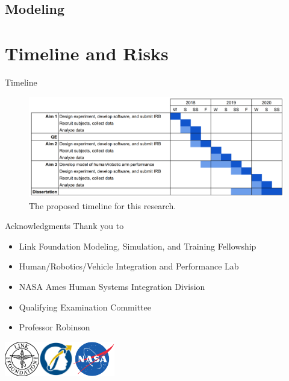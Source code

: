 \documentclass[10pt]{beamer}
\begin{document}
\subsection{Modeling}

\section{Timeline and Risks}

\begin{frame}[fragile]{Timeline}
  \begin{figure}[h!]
    \begin{center}
      \includegraphics[width=\linewidth]{./../img/image1.png}
      \caption{The proposed timeline for this research.}
      \label{timeline}
    \end{center}
  \end{figure}
\end{frame}

\begin{frame}[fragile]{Acknowledgments}
  Thank you to
  \begin{itemize}
    \item Link Foundation Modeling, Simulation, and Training Fellowship
    \item Human/Robotics/Vehicle Integration and Performance Lab
    \item NASA Ames Human Systems Integration Division
    \item Qualifying Examination Committee
    \item Professor Robinson
  \end{itemize}
  \hfill\includegraphics[height=1.5cm]{../img/linkfoundation.png}\includegraphics[height=1.5cm]{../img/hrvip.png}\includegraphics[height=1.5cm]{../img/nasa.png}
\end{frame}
\end{document}
